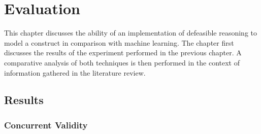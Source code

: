 
\chapter{Evaluation} %

\label{Chapter5} %


This chapter discusses the ability of an implementation of defeasible reasoning to model a construct in comparison with machine learning. The chapter first discusses the results of the experiment performed in the previous chapter. A comparative analysis of both techniques is then performed in the context of information gathered in the literature review.


\section{Results}






\subsection{Concurrent Validity}

